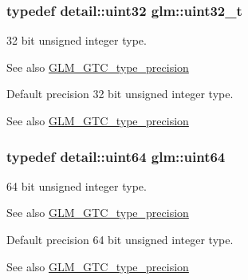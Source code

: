 \subsubsection[{uint32\+\_\+t}]{\setlength{\rightskip}{0pt plus 5cm}typedef {\bf detail\+::uint32} {\bf glm\+::uint32\+\_\+t}}\label{group__gtc__type__precision_ga822ca53a9ad412504532838906276a99}
32 bit unsigned integer type. \begin{DoxySeeAlso}{See also}
\hyperlink{group__gtc__type__precision}{G\+L\+M\+\_\+\+G\+T\+C\+\_\+type\+\_\+precision}
\end{DoxySeeAlso}
Default precision 32 bit unsigned integer type. \begin{DoxySeeAlso}{See also}
\hyperlink{group__gtc__type__precision}{G\+L\+M\+\_\+\+G\+T\+C\+\_\+type\+\_\+precision} 
\end{DoxySeeAlso}
\hypertarget{group__gtc__type__precision_gae3632bf9b37da66233d78930dd06378a}{}
\subsubsection[{uint64}]{\setlength{\rightskip}{0pt plus 5cm}typedef detail\+::uint64 {\bf glm\+::uint64}}\label{group__gtc__type__precision_gae3632bf9b37da66233d78930dd06378a}
64 bit unsigned integer type. \begin{DoxySeeAlso}{See also}
\hyperlink{group__gtc__type__precision}{G\+L\+M\+\_\+\+G\+T\+C\+\_\+type\+\_\+precision}
\end{DoxySeeAlso}
Default precision 64 bit unsigned integer type. \begin{DoxySeeAlso}{See also}
\hyperlink{group__gtc__type__precision}{G\+L\+M\+\_\+\+G\+T\+C\+\_\+type\+\_\+precision} 
\end{DoxySeeAlso}
\hypertarget{group__gtc__type__precision_ga058f57c19e1befdcf12498944bd73e69}{}
